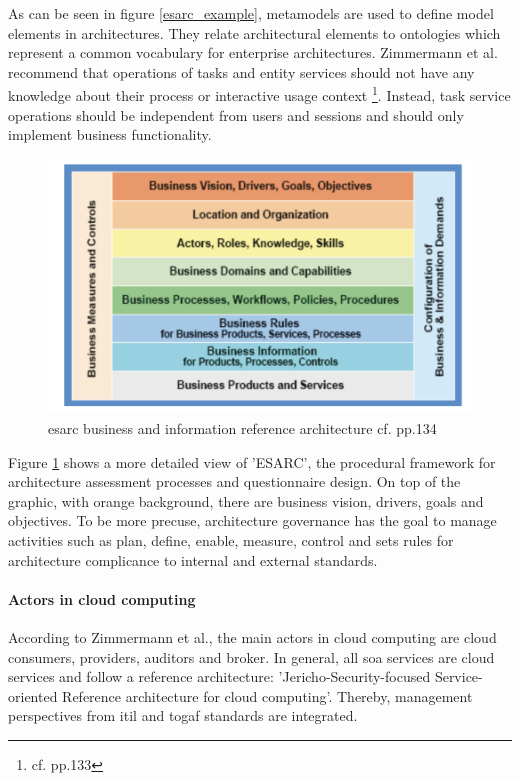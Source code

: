 As can be seen in figure \ref{esarc_example}, metamodels are used to define model elements in architectures. They relate architectural elements to ontologies which represent a common vocabulary for enterprise architectures.
Zimmermann et al. recommend that operations of tasks and entity services should not have any knowledge about their process or interactive usage context \footnote{cf.\autocite{zimmermann} pp.133}. Instead, task service operations should be independent from users and sessions and should only implement business functionality.

\begin{figure}[h!]
	\centering
	\includegraphics[width=1\textwidth]{images/esarc_business.png}
	\caption{\ac{esarc} business and information reference architecture cf.\autocite{zimmermann} pp.134}
	\label{vp_architecture}
\end{figure}

Figure \ref{vp_architecture} shows a more detailed view of 'ESARC', the procedural framework for architecture assessment processes and questionnaire design. On top of the graphic, with orange background, there are business vision, drivers, goals and objectives. To be more precuse, architecture governance has the goal to manage activities such as plan, define, enable, measure, control and sets rules for architecture complicance to internal and external standards. 

\paragraph{Actors in cloud computing}
According to Zimmermann et al., the main actors in cloud computing are cloud consumers, providers, auditors and broker. In general, all \ac{soa} services are cloud services and follow a reference architecture: 'Jericho-Security-focused Service-oriented Reference architecture for cloud computing'. Thereby, management perspectives from \ac{itil} and \ac{togaf} standards are integrated.

